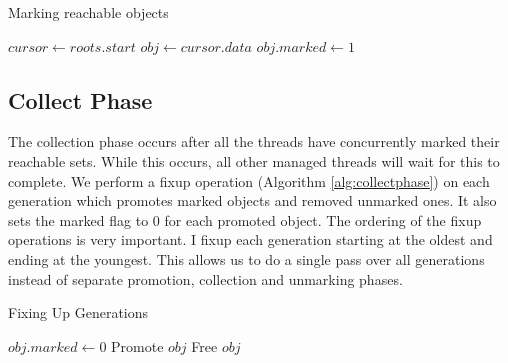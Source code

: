 \documentclass[../diss.tex]{subfiles}
\begin{document}
\begin{algorithm}
\caption{Marking reachable objects}
\label{alg:markphase}
\begin{algorithmic}


\State $cursor\gets roots.start$
\State $obj\gets cursor.data$ 
    \State $obj.marked\gets 1$
        \State{}
    \EndIf
\EndIf
\EndWhile

\EndFunction

\end{algorithmic}
\end{algorithm}

\subsection{Collect Phase}


The collection phase occurs after all the threads have concurrently marked their reachable sets. While this occurs, all other managed threads will wait for this to complete. We perform a fixup operation (Algorithm \ref{alg:collectphase}) on each generation which promotes marked objects and removed unmarked ones. It also sets the marked flag to 0 for each promoted object. The ordering of the fixup operations is very important. I fixup each generation starting at the oldest and ending at the youngest. This allows us to do a single pass over all generations instead of separate promotion, collection and unmarking phases.

\begin{algorithm}
\caption{Fixing Up Generations}
\label{alg:collectphase}
\begin{algorithmic}


    
            \State $obj.marked\gets 0$
                \State Promote $obj$
            \EndIf
        \Else
            \State Free $obj$
        \EndIf
    
    \EndFor

\EndFunction

\end{algorithmic}
\end{algorithm}
\end{document}
